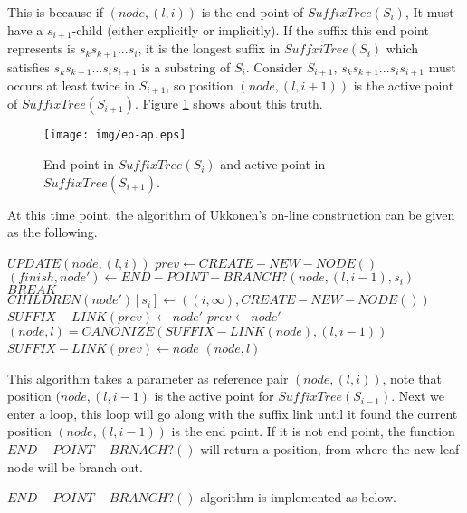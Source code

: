 \documentclass{article}
\begin{document}
This is because if $(node, (l, i))$ is the end point of $SuffixTree(S_i)$,
It must have a $s_{i+1}$-child (either explicitly or implicitly).
If the suffix this end point represents is $s_ks_{k+1}...s_i$, it is the longest
suffix in $SuffxiTree(S_i)$ which satisfies $s_ks_{k+1}...s_is_{i+1}$ is a substring
of $S_i$. Consider $S_{i+1}$, $s_ks_{k+1}...s_is_{i+1}$ must occurs at least
twice in $S_{i+1}$, so position $(node, (l, i+1))$ is the active point of
$SuffixTree(S_{i+1})$. Figure \ref{fig:ep-ap} shows about this truth.

\begin{figure}[htbp]
   \begin{center}
     \texttt{[image: img/ep-ap.eps]}
     \caption{End point in $SuffixTree(S_i)$ and active point in $SuffixTree(S_{i+1})$.}
     \label{fig:ep-ap}
   \end{center}
\end{figure}

At this time point, the algorithm of Ukkonen's on-line construction can 
be given as the following.

\begin{algorithmic}
\STATE $UPDATE(node, (l, i))$
  \STATE $prev \leftarrow CREATE-NEW-NODE()$
    \STATE $(finish, node') \leftarrow END-POINT-BRANCH?(node, (l, i-1), s_i)$
      \STATE $BREAK$
    \ENDIF
    \STATE $CHILDREN(node')[s_i] \leftarrow ((i, \infty), CREATE-NEW-NODE())$
    \STATE $SUFFIX-LINK(prev) \leftarrow node'$
    \STATE $prev \leftarrow node'$
    \STATE $(node, l) = CANONIZE(SUFFIX-LINK(node), (l, i-1))$
  \ENDWHILE
  \STATE $SUFFIX-LINK(prev) \leftarrow node$
  \RETURN $(node, l)$
\end{algorithmic}

This algorithm takes a parameter as reference pair $(node, (l, i))$, note that
position $(node, (l, i-1)$ is the active point for $SuffixTree(S_{i-1})$.
Next we enter a loop, this loop will go along with the suffix link until it
found the current position $(node, (l, i-1))$ is the end point. If it is not
end point, the function $END-POINT-BRNACH?()$ will return a position, from 
where the new leaf node will be branch out.

$END-POINT-BRANCH?()$ algorithm is implemented as below.
\end{document}
